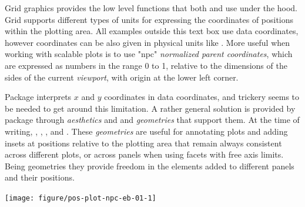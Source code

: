 \documentclass[krantz2]{krantz}\usepackage{knitr}%
\begin{document}
\begin{explainbox}

Grid graphics provides the low level functions that both  and  use under the hood. Grid supports different types of units for expressing the coordinates of positions within the plotting area. All examples outside this text box use  data coordinates, however coordinates can be also given in physical units like . More useful when working with scalable plots is to use "npc" \emph{normalized parent coordinates}, which are expressed as numbers in the range 0 to 1, relative to the dimensions of the sides of the current \emph{viewport}, with origin at the lower left corner.

Package  interprets $x$ and $y$ coordinates in  data coordinates, and trickery seems to be needed to get around this limitation. A rather general solution is provided by package  through \emph{aesthetics}  and  and \emph{geometries} that support them. At the time of writing, , , ,  and . These \emph{geometries} are useful for annotating plots and adding insets at positions relative to the plotting area that remain always consistent across different plots, or across panels when using facets with free axis limits. Being geometries they provide freedom in the elements added to different panels and their positions.

\begin{knitrout}\footnotesize
{}\color{fgcolor}\begin{kframe}
\begin{alltt}
\hlstd{(}  \hlstd{(}     \hlstd{=}  \hlopt{+}
  \hlstd{()} \hlopt{+}
  \hlstd{(} \hlstd{=} \hlstd{,}  \hlstd{=} \hlstd{,}  \hlstd{=} \hlstd{,}  \hlstd{=} \hlstd{)}
\end{alltt}
\end{kframe}

{\centering \texttt{[image: figure/pos-plot-npc-eb-01-1]} 

}



\end{knitrout}

\end{explainbox}
\end{document}
